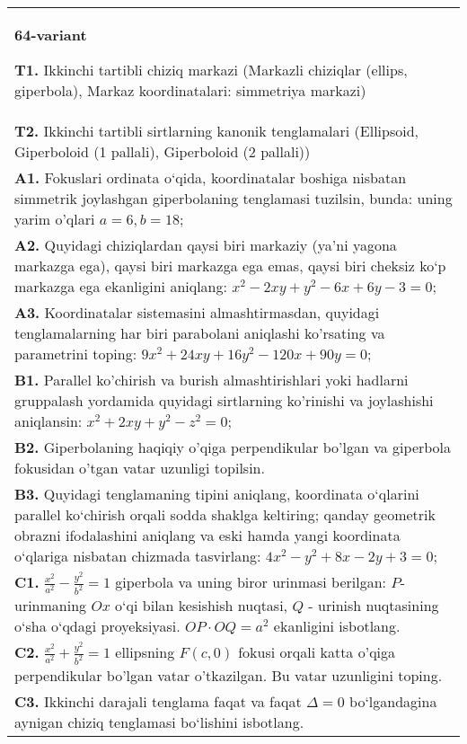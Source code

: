 \documentclass{article}
\begin{document}
\begin{tabular}{m{17cm}}
\textbf{64-variant}
\newline

\textbf{T1.} Ikkinchi tartibli chiziq markazi (Markazli chiziqlar (ellips, giperbola), Markaz koordinatalari: simmetriya markazi) \\
\textbf{T2.} Ikkinchi tartibli sirtlarning kanonik tenglamalari (Ellipsoid, Giperboloid (1 pallali), Giperboloid (2 pallali)) \\
\textbf{A1.} Fokuslari ordinata o‘qida, koordinatalar boshiga nisbatan simmetrik joylashgan giperbolaning tenglamasi tuzilsin, bunda: uning yarim o'qlari $a=6, b=18$; \\
\textbf{A2.} Quyidagi chiziqlardan qaysi biri markaziy (ya’ni yagona markazga ega), qaysi biri markazga ega emas, qaysi biri cheksiz ko‘p markazga ega ekanligini aniqlang: $x^2-2 x y+y^2-6 x+6 y-3=0$; \\
\textbf{A3.} Koordinatalar sistemasini almashtirmasdan, quyidagi tenglamalarning har biri parabolani aniqlashi ko'rsating va parametrini toping: $9 x^2+24 x y+16 y^2-120 x+90 y=0$; \\
\textbf{B1.} Parallel ko'chirish va burish almashtirishlari yoki hadlarni gruppalash yordamida quyidagi sirtlarning ko'rinishi va joylashishi aniqlansin: $x^2+2 x y+y^2-z^2=0$; \\
\textbf{B2.} Giperbolaning haqiqiy o'qiga perpendikular bo'lgan va giperbola fokusidan o'tgan vatar uzunligi topilsin. \\
\textbf{B3.} Quyidagi tenglamaning tipini aniqlang, koordinata o‘qlarini parallel ko‘chirish orqali sodda shaklga keltiring; qanday geometrik obrazni ifodalashini aniqlang va eski hamda yangi koordinata o‘qlariga nisbatan chizmada tasvirlang: $4 x^2-y^2+8 x-2 y+3=0$; \\
\textbf{C1.} $\frac{x^2}{a^2}-\frac{y^2}{b^2}=1$ giperbola va uning biror urinmasi berilgan: $P$-urinmaning $O x$ o‘qi bilan kesishish nuqtasi, $Q$ - urinish nuqtasining o‘sha o‘qdagi proyeksiyasi. $O P \cdot O Q=a^2$ ekanligini isbotlang. \\
\textbf{C2.} $\frac{x^2}{a^2}+\frac{y^2}{b^2}=1$ ellipsning $F(c, 0)$ fokusi orqali katta o'qiga perpendikular bo'lgan vatar o'tkazilgan. Bu vatar uzunligini toping. \\
\textbf{C3.} Ikkinchi darajali tenglama faqat va faqat $\Delta=0$ bo‘lgandagina aynigan chiziq tenglamasi bo‘lishini isbotlang. \\

\end{tabular}
\vspace{1cm}
\end{document}
